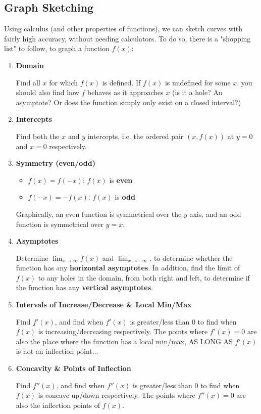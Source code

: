 \documentclass[12pt]{article}
\begin{document}
\subsection{Graph Sketching}

Using calculus (and other properties of functions), we can sketch curves with fairly high accuracy, without needing calculators. To do so, there is a "shopping list" to follow, to graph a function $f(x)$:

\begin{enumerate}
    \item \textbf{Domain}
    
     Find all $x$ for which $f(x)$ is defined. If $f(x)$ is undefined for some $x$, you should also find how $f$ behaves as it approaches $x$ (is it a hole? An asymptote? Or does the function simply only exist on a closed interval?)
     
    \item \textbf{Intercepts}
    
    Find both the $x$ and $y$ intercepts, i.e. the ordered pair $(x,f(x))$ at $y=0$ and $x=0$ respectively.
    
    \item \textbf{Symmetry (even/odd)}
    \begin{itemize}
        \item $f(x) = f(-x)$: $f(x)$ is \textbf{even}
        \item $f(-x) = -f(x)$: $f(x)$ is \textbf{odd}
    \end{itemize}
    
    Graphically, an even function is symmetrical over the $y$ axis, and an odd function is symmetrical over $y=x$.
    
    \item \textbf{Asymptotes}
    
    Determine $\lim_{x\to\infty} f(x)$ and $\lim_{x\to-\infty}$, to determine whether the function has any \textbf{horizontal asymptotes}. In addition, find the limit of $f(x)$ to any holes in the domain, from both right and left, to determine if the function has any \textbf{vertical asymptotes}. 
    
    \item \textbf{Intervals of Increase/Decrease \& Local Min/Max}
    
    Find $f'(x)$, and find when $f'(x)$ is greater/less than 0 to find when $f(x)$ is increasing/decreasing respectively. The points where $f'(x) = 0$ are also the place where the function has a local min/max, AS LONG AS $f'(x)$ is not an inflection point...
    
    \item \textbf{Concavity \& Points of Inflection}
    
    Find $f''(x)$, and find when $f''(x)$ is greater/less than 0 to find when $f(x)$ is concave up/down respectively. The points where $f''(x) = 0$ are also the inflection points of $f(x)$.
\end{enumerate}
\end{document}

